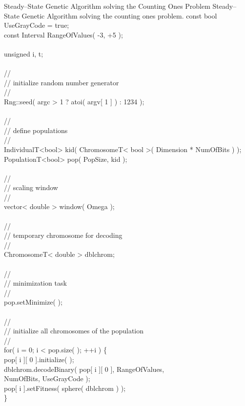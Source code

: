\begin{programlisting}{Steady--State Genetic Algorithm solving the Counting Ones Problem}{
    Steady--State Genetic Algorithm solving the counting ones problem.}
    const bool     UseGrayCode = true;\\
    const Interval RangeOfValues( -3, +5 );\\
\\
    unsigned i, t;\\
\\
    //\\
    // initialize random number generator\\
    //\\
    Rng::seed( argc > 1 ? atoi( argv[ 1 ] ) : 1234 );\\
\\
    //\\
    // define populations\\
    //\\
    IndividualT<bool> kid( ChromosomeT< bool >( Dimension * NumOfBits ) );\\
    PopulationT<bool> pop( PopSize, kid );\\
\\
    //\\
    // scaling window\\
    //\\
    vector< double > window( Omega );\\
\\
    //\\
    // temporary chromosome for decoding\\
    //\\
    ChromosomeT< double > dblchrom;\\
\\
    //\\
    // minimization task\\
    //\\
    pop.setMinimize( );\\
\\
    //\\
    // initialize all chromosomes of the population\\
    //\\
    for( i = 0; i < pop.size( ); ++i ) \{\\
        pop[ i ][ 0 ].initialize( );\\
        dblchrom.decodeBinary( pop[ i ][ 0 ], RangeOfValues,\\
                               NumOfBits, UseGrayCode );\\
        pop[ i ].setFitness( sphere( dblchrom ) );\\
    \}\\

\end{programlisting}
